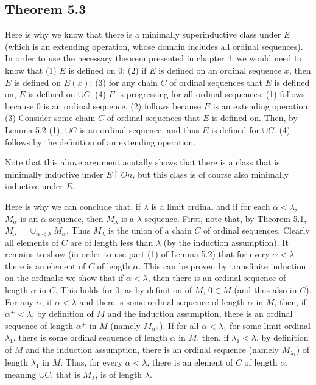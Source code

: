 \documentclass{article}
\theoremstyle{definition}
\begin{document}
\subsection*{Theorem 5.3}
Here is why we know that there is a minimally superinductive class under $E$ (which is an extending operation, whose domain includes all ordinal sequences). 
In order to use the necessary theorem presented in chapter 4, we would need to know that 
(1) $E$ is defined on 0; (2) if $E$ is defined on an ordinal sequence $x$, then $E$ is defined on $E(x)$; (3) for any chain $C$ of ordinal sequences that $E$ is defined on, $E$ is defined on 
$\cup C$; (4) $E$ is progressing for all ordinal sequences. 
(1) follows because $0$ is an ordinal sequence. (2) follows because $E$ is an extending operation. (3) Consider some chain $C$ of 
ordinal sequences that $E$ is defined on. Then, by Lemma 5.2 (1), $\cup C$ is an ordinal sequence, and thus $E$ is defined for 
$\cup C$. (4) follows by the definition of an extending operation.

Note that this above argument acutally shows that there is a class that is minimally inductive under $E\restriction On$, but this class is of course also minimally inductive 
under $E$.

Here is why we can conclude that, if $\lambda$ is a limit ordinal and if for each $\alpha<\lambda$, $M_\alpha$ is an $\alpha$-sequence, 
then $M_\lambda$ is a $\lambda$ sequence. First, note that, by Theorem 5.1, $M_\lambda=\cup_{\alpha<\lambda}M_\alpha$. Thus 
$M_\lambda$ is the union of a chain $C$ of ordinal sequences. Clearly all elements of $C$ are of length less than $\lambda$ (by the induction assumption). 
It remains to show (in order to use part (1) of Lemma 5.2) that for every 
$\alpha<\lambda$ there is an element of $C$ of length $\alpha$. This can be proven by transfinite induction on the ordinals: we show that if 
$\alpha<\lambda$, then there is an ordinal sequence of length $\alpha$ in $C$. This holds for 0, as by definition of $M$, $0\in M$ (and thus also 
in $C$). For any $\alpha$, if $\alpha<\lambda$ and there is some ordinal sequence of length $\alpha$ in $M$, then, if $\alpha^+<\lambda$, by definition 
of $M$ and the induction assumption, there is an ordinal sequence of length $\alpha^+$ in $M$ (namely $M_{\alpha^+}$). 
If for all $\alpha<\lambda_1$ for some limit ordinal $\lambda_1$, there is some ordinal 
sequence of length $\alpha$ in $M$, then, if $\lambda_1<\lambda$, by definition of $M$ and the induction assumption, there is an ordinal sequence (namely $M_{\lambda_1}$) 
of length $\lambda_1$ in $M$. Thus, 
for every $\alpha<\lambda$, there is an element of $C$ of length $\alpha$, meaning $\cup C$, that is $M_\lambda$, is of length $\lambda$. 
\end{document}
